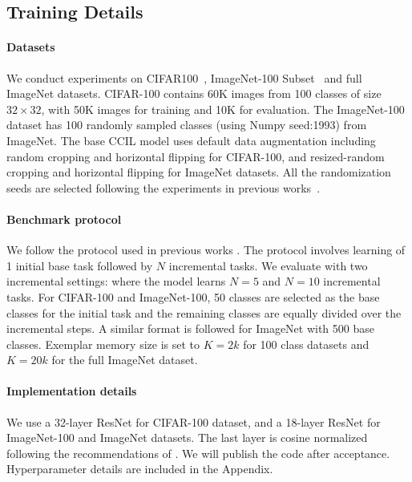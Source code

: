 \documentclass[final]{cvpr}
\newcommand{\ilkd}{CCIL }
\begin{document}
\subsection{Training Details}


\paragraph{Datasets} We conduct experiments on CIFAR100~\cite{Krizhevsky09learningmultiple}, ImageNet-100 Subset~\cite{imagenet_cvpr09} and full ImageNet datasets. CIFAR-100 contains 60K images from 100 classes of size $32\times32$, with 50K images for training and 10K for evaluation. The ImageNet-100 dataset has 100 randomly sampled classes (using Numpy seed:1993) from ImageNet.
The base \ilkd model uses default data augmentation including random cropping and horizontal flipping for CIFAR-100, and resized-random cropping and horizontal flipping for ImageNet datasets. All the randomization seeds are selected following the experiments in previous works~\cite{lucir, mnemonics}.




\paragraph{Benchmark protocol} We follow the protocol used in previous works \cite{lucir, mnemonics}. The protocol involves learning of 1 initial base task followed by $N$ incremental tasks. We evaluate with two incremental settings: where the model learns $N=5$ and $N=10$ incremental tasks. For CIFAR-100 and ImageNet-100, 50 classes are selected as the base classes for the initial task and the remaining classes are equally divided over the incremental steps. A similar format is followed for ImageNet with 500 base classes. Exemplar memory size is set to $K=2k$ for 100 class datasets and $K=20k$ for the full ImageNet dataset.

\paragraph{Implementation details} We use a 32-layer ResNet \cite{He_2016_CVPR} for CIFAR-100 dataset, and a 18-layer ResNet for ImageNet-100 and ImageNet datasets. The last layer is cosine normalized following the recommendations of \cite{lucir}. We will publish the code after acceptance. Hyperparameter details are included in the Appendix. 
\end{document}
